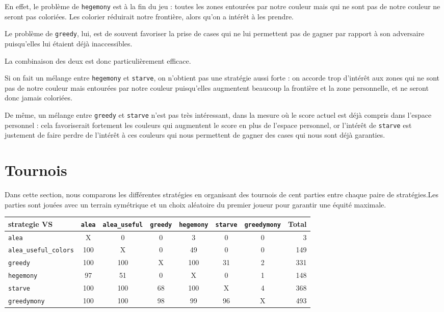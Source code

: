 \documentclass[12pt]{article}
\def\sec#1{\section{#1}}
\begin{document}
En effet, le problème de \texttt{hegemony} est à la fin du jeu : toutes les zones entourées par notre couleur mais qui ne sont pas de notre couleur ne seront pas coloriées. Les colorier réduirait notre frontière, alors qu'on a intérêt à les prendre.

Le problème de \texttt{greedy}, lui, est de souvent favoriser la prise de cases qui ne lui permettent pas de gagner par rapport à son adversaire puisqu'elles lui étaient déjà inaccessibles.

La combinaison des deux est donc particulièrement efficace.

Si on fait un mélange entre \texttt{hegemony} et \texttt{starve}, on n'obtient pas une stratégie aussi forte : on accorde trop d'intérêt aux zones qui ne sont pas de notre couleur mais entourées par notre couleur puisqu'elles augmentent beaucoup la frontière et la zone personnelle, et ne seront donc jamais coloriées.

De même, un mélange entre \texttt{greedy} et \texttt{starve} n'est pas très intéressant, dans la mesure où le score actuel est déjà compris dans l'espace personnel : cela favoriserait fortement les couleurs qui augmentent le score en plus de l'espace personnel, or l'intérêt de \texttt{starve} est justement de faire perdre de l'intérêt à ces couleurs qui nous permettent de gagner des cases qui nous sont déjà garanties. 

\sec{Tournois}
Dans cette section, nous comparons les différentes stratégies en organisant des tournois de cent parties entre chaque paire de stratégies.Les parties sont jouées avec un terrain symétrique et un choix aléatoire du premier joueur pour garantir une équité maximale.\\


\begin{tabular}{l|c|c|c|c|c|c|r}
strategie VS & \texttt{alea} & \texttt{alea\_useful} & \texttt{greedy} & \texttt{hegemony} & \texttt{starve} & \texttt{greedymony} & Total\\
\hline
\texttt{alea} & X & 0 & 0 & 3 & 0 & 0 & 3\\
\hline
\texttt{alea\_useful\_colors} & 100 & X & 0 & 49 & 0 & 0 & 149\\
\hline
\texttt{greedy} & 100 & 100 & X & 100 & 31 & 2 & 331\\
\hline
\texttt{hegemony} & 97 & 51 & 0 & X & 0 & 1 & 148\\
\hline
\texttt{starve} & 100 & 100 & 68 & 100 & X & 4 & 368\\
\hline
\texttt{greedymony} & 100 & 100 & 98 & 99 & 96 & X & 493\\
\hline
\end{tabular}\\
\end{document}
